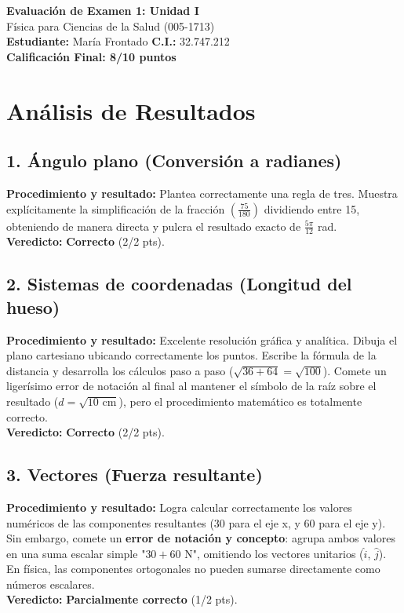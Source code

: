 \documentclass[12pt]{article}
\begin{document}
\begin{center}
    \Large \textbf{Evaluación de Examen 1: Unidad I} \\
    \large Física para Ciencias de la Salud (005-1713) \\
    \vspace{0.5cm}
    \textbf{Estudiante:} María Frontado \quad \textbf{C.I.:} 32.747.212
    \vspace{0.3cm} \\
    \large \textbf{Calificación Final: 8/10 puntos}
\end{center}

\vspace{0.5cm}

\section*{Análisis de Resultados}

\subsection*{1. Ángulo plano (Conversión a radianes)}
\textbf{Procedimiento y resultado:} Plantea correctamente una regla de tres. Muestra explícitamente la simplificación de la fracción $\left(\frac{75}{180}\right)$ dividiendo entre 15, obteniendo de manera directa y pulcra el resultado exacto de $\frac{5\pi}{12}$ rad. \\
\textbf{Veredicto:} \textbf{Correcto} (2/2 pts).

\subsection*{2. Sistemas de coordenadas (Longitud del hueso)}
\textbf{Procedimiento y resultado:} Excelente resolución gráfica y analítica. Dibuja el plano cartesiano ubicando correctamente los puntos. Escribe la fórmula de la distancia y desarrolla los cálculos paso a paso ($\sqrt{36+64} = \sqrt{100}$). Comete un ligerísimo error de notación al final al mantener el símbolo de la raíz sobre el resultado ($d = \sqrt{10\text{ cm}}$), pero el procedimiento matemático es totalmente correcto. \\
\textbf{Veredicto:} \textbf{Correcto} (2/2 pts).

\subsection*{3. Vectores (Fuerza resultante)}
\textbf{Procedimiento y resultado:} Logra calcular correctamente los valores numéricos de las componentes resultantes (30 para el eje x, y 60 para el eje y). Sin embargo, comete un \textbf{error de notación y concepto}: agrupa ambos valores en una suma escalar simple "$30 + 60$ N", omitiendo los vectores unitarios ($\hat{i}$, $\hat{j}$). En física, las componentes ortogonales no pueden sumarse directamente como números escalares. \\
\textbf{Veredicto:} \textbf{Parcialmente correcto} (1/2 pts).
\end{document}
